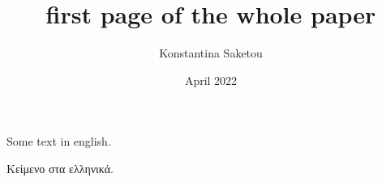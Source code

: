 \documentclass[12pt]{report}
\title{first page of the whole paper}
\author{Konstantina Saketou}
\date{April 2022}
\begin{document}
\maketitle

Some text in english.

Κείμενο στα ελληνικά.



\nocite{*}





\end{document}
